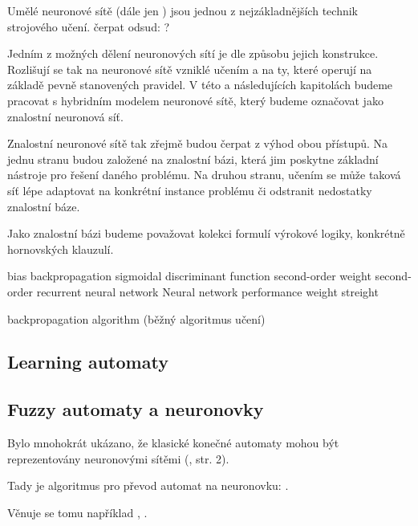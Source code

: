 \documentclass[a4paper,10pt]{article}
\begin{document}
Umělé neuronové sítě (dále jen ) jsou jednou z nejzákladnějších technik strojového učení.   
čerpat odsud: \cite{TowSha-KnowBas-ArtNeuNet}?

Jedním z možných dělení neuronových sítí je dle způsobu jejich konstrukce. Rozlišují se tak na neuronové sítě vzniklé učením a na ty, které operují na základě pevně stanovených pravidel. V této a následujících kapitolách budeme pracovat s hybridním modelem neuronové sítě, který budeme označovat jako znalostní neuronová síť.

Znalostní neuronové sítě tak zřejmě budou čerpat z výhod obou přístupů. Na jednu stranu budou založené na znalostní bázi, která jim poskytne základní nástroje pro řešení daného problému. Na druhou stranu, učením se může taková síť lépe adaptovat na konkrétní instance problému či odstranit nedostatky znalostní báze.

Jako znalostní bázi budeme považovat kolekci formulí výrokové logiky, konkrétně hornovských klauzulí. 





bias
backpropagation
sigmoidal discriminant function
second-order weight
second-order recurrent neural network
Neural network performance
weight streight

backpropagation algorithm (běžný algoritmus učení)

\subsection{Learning automaty}


\subsection{Fuzzy automaty a neuronovky}

Bylo mnohokrát ukázano, že klasické konečné automaty mohou být reprezentovány neuronovými sítěmi (\cite{OmlThoGil-FuzzFinStaAutCanDetEncIntRecNeuNet}, str. 2).

Tady je algoritmus pro převod automat na neuronovku: \cite{OmlThoGil-FuzzFinStaAutCanDetEncIntRecNeuNet}.


Věnuje se tomu například \cite{DarAhmSin-AppFuzzAutTheKnBsNeuNetDevBasLeaMod}, \cite{OmlThoGil-FuzzFinStaAutCanDetEncIntRecNeuNet}.
\end{document}
